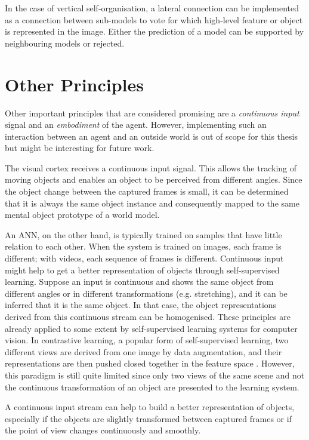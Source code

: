 \begin{implementation}
	In the case of vertical self-organisation, a lateral connection can be implemented as a connection between sub-models to vote for which high-level feature or object is represented in the image. Either the prediction of a model can be supported by neighbouring models or rejected.
\end{implementation}


\section{Other Principles}
Other important principles that are considered promising are a \emph{continuous input} signal and an \emph{embodiment} of the agent.
However, implementing such an interaction between an agent and an outside world is out of scope for this thesis but might be interesting for future work.

The visual cortex receives a continuous input signal.
This allows the tracking of moving objects and enables an object to be perceived from different angles. Since the object change between the captured frames is small, it can be determined that it is always the same object instance and consequently mapped to the same mental object prototype of a world model.

An ANN, on the other hand, is typically trained on samples that have little relation to each other.
When the system is trained on images, each frame is different; with videos, each sequence of frames is different.
Continuous input might help to get a better representation of objects through self-supervised learning.
Suppose an input is continuous and shows the same object from different angles or in different transformations (e.g. stretching), and it can be inferred that it is the same object. In that case, the object representations derived from this continuous stream can be homogenised.
These principles are already applied to some extent by self-supervised learning systems for computer vision.
In contrastive learning, a popular form of self-supervised learning, two different views are derived from one image by data augmentation, and their representations are then pushed closed together in the feature space .
However, this paradigm is still quite limited since only two views of the same scene and not the continuous transformation of an object are presented to the learning system.

\begin{claim}
	A continuous input stream can help to build a better representation of objects, especially if the objects are slightly transformed between captured frames or if the point of view changes continuously and smoothly.
\end{claim}


